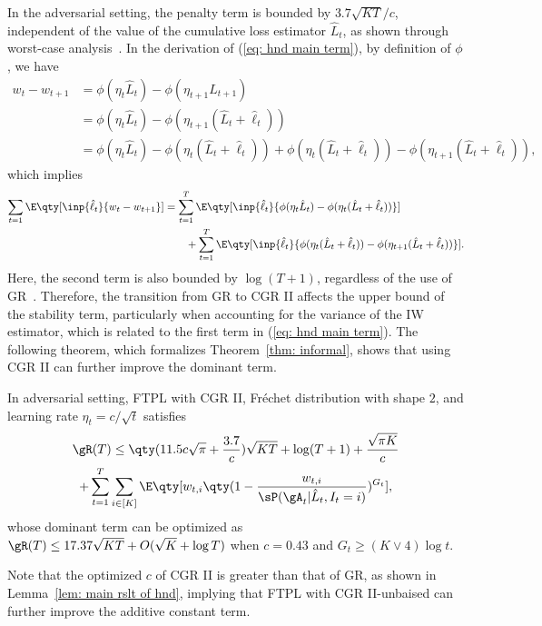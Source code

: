 In the adversarial setting, the penalty term is bounded by $3.7\sqrt{KT}/c$, independent of the value of the cumulative loss estimator $\hat{L}_t$, as shown through worst-case analysis~\citep[see][Lemma 9]{pmlr-v201-honda23a}.
In the derivation of (\ref{eq: hnd main term}), by definition of $\phi$, we have
\begin{align*}
        w_t - w_{t+1} &= \phi(\eta_t \hat{L}_t) - \phi(\eta_{t+1} \hat{L}_{t+1}) \\
        &= \phi(\eta_t \hat{L}_t) - \phi(\eta_{t+1} (\hat{L}_{t}+\hat{\ell}_t)) \\
        &= \phi(\eta_t \hat{L}_t) - \phi(\eta_{t} (\hat{L}_{t}+\hat{\ell}_t)) + \phi(\eta_{t} (\hat{L}_{t}+\hat{\ell}_t)) - \phi(\eta_{t+1} (\hat{L}_{t}+\hat{\ell}_t)),
\end{align*}
which implies
\begin{align*}
    \sum_{t=1} \E \qty[\inp{\hat{\ell}_t}{w_t - w_{t+1}}] &=  \sum_{t=1}^T \E \qty[\inp{\hat{\ell}_t}{\phi(\eta_t \hat{L}_t)-\phi(\eta_t (\hat{L}_t+\hat{\ell}_t))}] \\
    & \qquad + \sum_{t=1}^T \E \qty[\inp{\hat{\ell}_t}{\phi(\eta_{t} (\hat{L}_{t}+\hat{\ell}_t)) - \phi(\eta_{t+1} (\hat{L}_{t}+\hat{\ell}_t))}].
\end{align*}
Here, the second term is also bounded by $\log (T+1)$, regardless of the use of GR~\citep[see][Lemma 8]{pmlr-v247-lee24a}.
Therefore, the transition from GR to CGR II affects the upper bound of the stability term, particularly when accounting for the variance of the IW estimator, which is related to the first term in (\ref{eq: hnd main term}).
The following theorem, which formalizes Theorem~\ref{thm: informal}, shows that using CGR II can further improve the dominant term.
\begin{theorem}\label{thm: formal}
    In adversarial setting, FTPL with CGR II, Fr\'echet distribution with shape $2$, and learning rate $\eta_t = c/\sqrt{t}$ satisfies
    \begin{multline*}
        \gR(T) \leq \qty(11.5c\sqrt{\pi}+\frac{3.7}{c}) \sqrt{KT} + \log(T+1) + \frac{\sqrt{\pi K}}{c} \\
        + \sum_{t=1}^T \sum_{i\in [K]}\E\qty[w_{t,i}\qty(1-\frac{w_{t,i}}{\sP(\gA_{t}| \hat{L}_t, I_t=i)})^{G_t}],
    \end{multline*}
    whose dominant term can be optimized as $\gR(T)\leq 17.37\sqrt{KT} +O(\sqrt{K}+\log T)$ when $c=0.43$ and $G_t \geq (K \lor 4)\log t$. 
\end{theorem}
Note that the optimized $c$ of CGR II is greater than that of GR, as shown in Lemma~\ref{lem: main rslt of hnd}, implying that FTPL with CGR II-unbaised can further improve the additive constant term.

